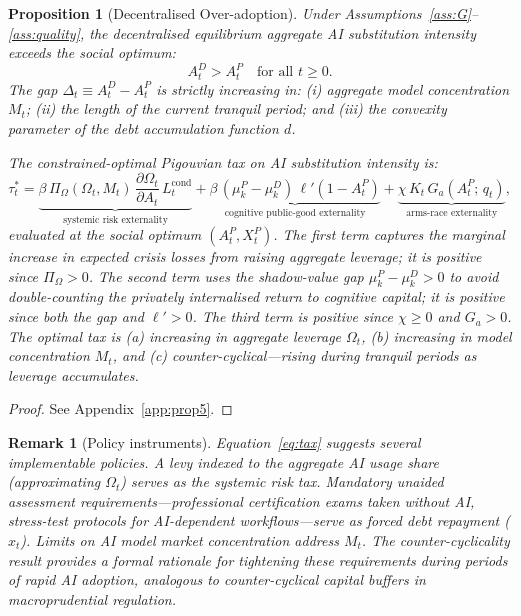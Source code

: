 \documentclass[12pt]{article}
\newtheorem{proposition}{Proposition}
\newtheorem{remark}{Remark}
\begin{document}
\begin{proposition}[Decentralised Over-adoption]
\label{prop:welfare}
Under Assumptions~\ref{ass:G}--\ref{ass:quality}, the decentralised equilibrium
aggregate AI substitution intensity exceeds the social optimum:
\[
A_t^D > A_t^P \quad \text{for all } t \geq 0.
\]
The gap $\Delta_t \equiv A_t^D - A_t^P$ is strictly increasing in: (i) aggregate
model concentration $M_t$; (ii) the length of the current tranquil period; and
(iii) the convexity parameter of the debt accumulation function $d$.

The constrained-optimal Pigouvian tax on AI substitution intensity is:
\begin{equation}
\tau_t^* =
\underbrace{\beta\,\Pi_\Omega(\Omega_t,M_t)\,\frac{\partial \Omega_t}{\partial A_t}\,
L_t^{\text{cond}}}_{\text{systemic risk externality}}
+\underbrace{\beta\,(\mu_k^P - \mu_k^D)\,\ell'(1-A_t^P)}_{\text{cognitive public-good externality}}
+\underbrace{\chi\,K_t\,G_a(A_t^P;\,q_t)}_{\text{arms-race externality}},
\label{eq:tax}
\end{equation}
evaluated at the social optimum $(A_t^P, X_t^P)$. The first term captures the
marginal increase in expected crisis losses from raising aggregate leverage; it is
positive since $\Pi_\Omega > 0$. The second term uses the shadow-value gap
$\mu_k^P - \mu_k^D > 0$ to avoid double-counting the privately internalised return
to cognitive capital; it is positive since both the gap and $\ell'>0$. The third
term is positive since $\chi \geq 0$ and $G_a > 0$. The optimal tax is (a)
increasing in aggregate leverage $\Omega_t$, (b) increasing in model concentration
$M_t$, and (c) counter-cyclical---rising during tranquil periods as leverage
accumulates.
\end{proposition}

\begin{proof}
See Appendix~\ref{app:prop5}.
\end{proof}

\begin{remark}[Policy instruments]
Equation~\eqref{eq:tax} suggests several implementable policies. A levy indexed to
the aggregate AI usage share (approximating $\Omega_t$) serves as the systemic risk
tax. Mandatory unaided assessment requirements---professional certification exams
taken without AI, stress-test protocols for AI-dependent workflows---serve as
forced debt repayment ($x_t$). Limits on AI model market concentration address $M_t$.
The counter-cyclicality result provides a formal rationale for tightening these
requirements during periods of rapid AI adoption, analogous to counter-cyclical
capital buffers in macroprudential regulation.
\end{remark}
\end{document}
